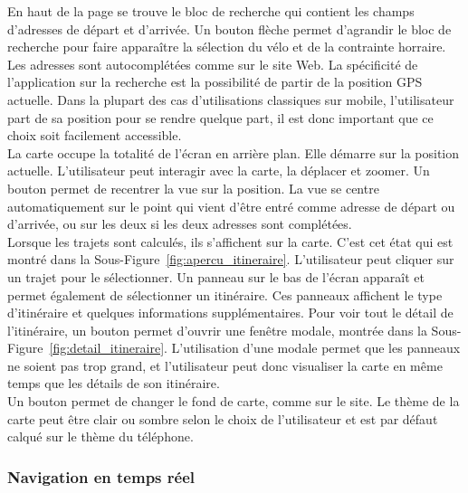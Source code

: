 \noindent En haut de la page se trouve le bloc de recherche qui contient les champs d'adresses de départ et d'arrivée. Un bouton flèche permet d'agrandir le bloc de recherche pour faire apparaître la sélection du vélo et de la contrainte horraire. Les adresses sont autocomplétées comme sur le site Web. La spécificité de l'application sur la recherche est la possibilité de partir de la position GPS actuelle. Dans la plupart des cas d'utilisations classiques sur mobile, l'utilisateur part de sa position pour se rendre quelque part, il est donc important que ce choix soit facilement accessible.\\

\noindent La carte occupe la totalité de l'écran en arrière plan. Elle démarre sur la position actuelle. L'utilisateur peut interagir avec la carte, la déplacer et zoomer. Un bouton permet de recentrer la vue sur la position. La vue se centre automatiquement sur le point qui vient d'être entré comme adresse de départ ou d'arrivée, ou sur les deux si les deux adresses sont complétées.\\

\noindent Lorsque les trajets sont calculés, ils s'affichent sur la carte. C'est cet état qui est montré dans la Sous-Figure~\ref{fig:apercu_itineraire}. L'utilisateur peut cliquer sur un trajet pour le sélectionner. Un panneau sur le bas de l'écran apparaît et permet également de sélectionner un itinéraire. Ces panneaux affichent le type d'itinéraire et quelques informations supplémentaires. Pour voir tout le détail de l'itinéraire, un bouton permet d'ouvrir une fenêtre modale, montrée dans la Sous-Figure~\ref{fig:detail_itineraire}. L'utilisation d'une modale permet que les panneaux ne soient pas trop grand, et l'utilisateur peut donc visualiser la carte en même temps que les détails de son itinéraire.\\

\noindent Un bouton permet de changer le fond de carte, comme sur le site. Le thème de la carte peut être clair ou sombre selon le choix de l'utilisateur et est par défaut calqué sur le thème du téléphone.\\

\subsubsection{Navigation en temps réel}
\label{sec:mobile-navigation}

